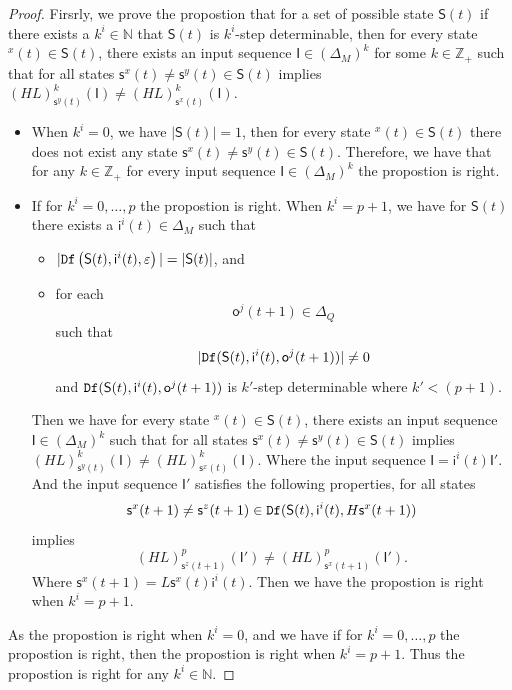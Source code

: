 \begin{proof} Firsrly, we prove the propostion that for a set of possible state $\mathsf{S}(t)$ if there exists a $k^{i}\in \mathbb{N}$ that $\mathsf{S}(t)$ is $k^{i}$-step determinable, then for every state \State$^{x}(t)$$\in \mathsf{S}(t)$, there exists an input sequence $\mathsf{I}\in(\Delta_M)^k$ for some $k\in \mathbb{Z}_+$ such that for all states $\mathsf{s}^{x}(t)\neq \mathsf{s}^{y}(t)\in \mathsf{S}(t)$ implies $(HL)^k_{\mathsf{s}^{y}(t)}(\mathsf{I})\neq (HL)^k_{{\mathsf{s}^{x}(t)}}(\mathsf{I})$.
\begin{itemize}
\item When $k^{i}=0$, we have $|\mathsf{S}(t)|=1$, then for every state \State$^{x}(t)$$\in \mathsf{S}(t)$ there does not exist any state $\mathsf{s}^{x}(t)\neq \mathsf{s}^{y}(t)\in \mathsf{S}(t)$. Therefore, we have that for any $k\in \mathbb{Z}_+$ for every input sequence $\mathsf{I}\in(\Delta_M)^k$ the propostion is right. 
\item If for $k^{i}=0,\ldots, p$ the propostion is right. When $k^{i}=p+1$, we have for $\mathsf{S}(t)$ there exists a $\mathsf{i}^{i}(t)\in \Delta_M$ such that
 \begin{itemize}
 \item  $|{\tt Df}\left(\mathsf{S}(t),\mathsf{i}^{i}(t),\varepsilon\right)|=|\mathsf{S}(t)|$, and 
 \item  for each \[\mathsf{o}^{j}(t+1)\in \Delta_Q\] such that \[|{\tt Df}(\mathsf{S}(t),\mathsf{i}^{i}(t),\mathsf{o}^{j}(t+1))|\neq 0\] and ${\tt Df}(\mathsf{S}(t),\mathsf{i}^{i}(t),\mathsf{o}^{j}(t+1))$ is $k'$-step determinable where ${k'}<(p+1)$.
 \end{itemize}
 Then we have for every state \State$^{x}(t)$$\in \mathsf{S}(t)$, there exists an input sequence $\mathsf{I}\in(\Delta_M)^k$ such that for all states $\mathsf{s}^{x}(t)\neq \mathsf{s}^{y}(t)\in \mathsf{S}(t)$ implies $(HL)^k_{\mathsf{s}^{y}(t)}(\mathsf{I})\neq (HL)^k_{{\mathsf{s}^{x}(t)}}(\mathsf{I})$. Where the input sequence $\mathsf{I}=\mathsf{i}^{i}(t)\mathsf{I}'$. And the input sequence $\mathsf{I}'$ satisfies the following properties, %
  for all states \[\mathsf{s}^{x}(t+1)\neq \mathsf{s}^{z}(t+1)\in {\tt Df}(\mathsf{S}(t),\mathsf{i}^{i}(t),H\mathsf{s}^{x}(t+1))\] implies \[(HL)^p_{\mathsf{s}^{z}(t+1)}(\mathsf{I}')\neq (HL)^p_{{\mathsf{s}^{x}(t+1)}}(\mathsf{I}').\] Where $\mathsf{s}^{x}(t+1)=L\mathsf{s}^{x}(t)\mathsf{i}^{i}(t)$. Then we have the propostion is right when $k^{i}=p+1$. 
\end{itemize}
As the propostion is right when $k^{i}=0$, and we have if for $k^{i}=0,\ldots, p$ the propostion is right, then the propostion is right when $k^{i}=p+1$. Thus the propostion is right for any $k^{i}\in \mathbb{N}$.


\end{proof}
